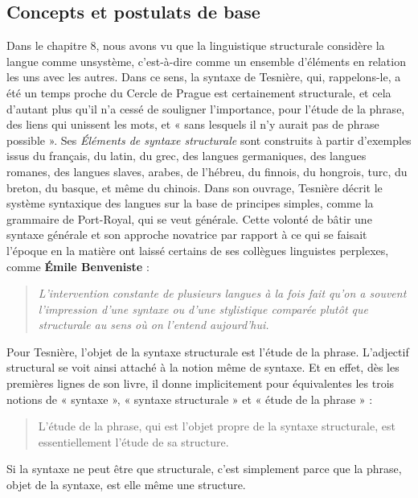 \subsection{Concepts et postulats de base}
Dans le chapitre 8, nous avons vu que la linguistique structurale considère la langue comme unsystème, c’est-à-dire comme un ensemble d’éléments en relation les uns avec les autres. Dans ce sens, la syntaxe de Tesnière, qui, rappelons-le, a été un temps proche du Cercle de Prague est certainement structurale, et cela d’autant plus qu’il n’a cessé de souligner l’importance, pour l’étude de la phrase, des liens qui unissent les mots, et « sans lesquels il n’y aurait pas de phrase possible ». Ses \textit{Éléments de syntaxe structurale} sont construits à partir d’exemples issus du français, du latin, du grec, des langues germaniques, des langues romanes, des langues slaves, arabes, de l’hébreu, du finnois, du hongrois, turc, du breton, du basque, et même du chinois. Dans son ouvrage, Tesnière décrit le système syntaxique des langues sur la base de principes simples, comme la grammaire de Port-Royal, qui se veut générale. Cette volonté de bâtir une syntaxe générale et son approche novatrice par rapport à ce qui se faisait l’époque en la matière ont laissé certains de ses collègues linguistes perplexes, comme \textbf{Émile Benveniste} :
\begin{quote}\small\itshape
L’intervention constante de plusieurs langues à la fois fait qu’on a souvent l’impression d’une syntaxe ou d’une stylistique comparée plutôt que structurale au sens où on l’entend aujourd’hui.
\end{quote}

Pour Tesnière, l’objet de la syntaxe structurale est l’étude de la phrase. L’adjectif structural se voit ainsi attaché à la notion même de syntaxe. Et en effet, dès les premières lignes de son livre, il donne implicitement pour équivalentes les trois notions de « syntaxe », « syntaxe structurale » et « étude de la phrase » :
\begin{quote}
L’étude de la phrase, qui est l’objet propre de la syntaxe structurale, est essentiellement l’étude de sa structure.
\end{quote}
Si la syntaxe ne peut être que structurale, c’est simplement parce que la phrase, objet de la syntaxe, est elle même une structure.

